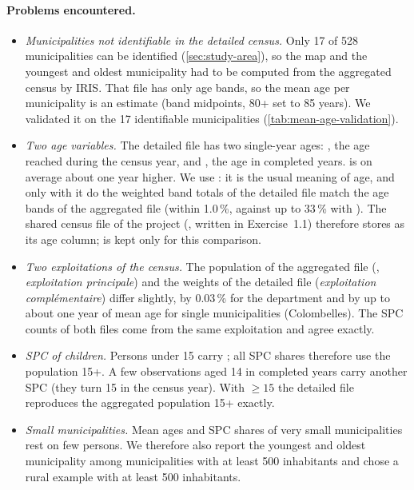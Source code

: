 \paragraph{Problems encountered.}
\begin{itemize}
  \item \emph{Municipalities not identifiable in the detailed census.} Only 17 of 528 municipalities can be identified
  (\cref{sec:study-area}), so the map and the youngest and oldest municipality had to be computed from the aggregated
  census by IRIS. That file has only age bands, so the mean age per municipality is an estimate (band midpoints, 80+
  set to 85 years). We validated it on the 17 identifiable municipalities (\cref{tab:mean-age-validation}).
  \item \emph{Two age variables.} The detailed file has two single-year ages: , the age reached during the
  census year, and , the age in completed years.  is on average about one year higher. We use
  : it is the usual meaning of age, and only with it do the weighted band totals of the detailed file match
  the age bands of the aggregated file (within 1.0\,\%, against up to 33\,\% with ). The shared census
  file of the project (, written in Exercise~1.1) therefore stores  as its
  age column;  is kept only for this comparison.
  \item \emph{Two exploitations of the census.} The population of the aggregated file (,
  \emph{exploitation principale}) and the weights of the detailed file (\emph{exploitation compl\'ementaire}) differ
  slightly, by 0.03\,\% for the department and by up to about one year of mean age for single municipalities
  (Colombelles). The SPC counts of both files come from the same exploitation and agree exactly.
  \item \emph{SPC of children.} Persons under 15 carry ; all SPC shares therefore use the population 15+.
  A few observations aged 14 in completed years carry another SPC (they turn 15 in the census year). With
   $\geq 15$ the detailed file reproduces the aggregated population 15+ exactly.
  \item \emph{Small municipalities.} Mean ages and SPC shares of very small municipalities rest on few persons. We
  therefore also report the youngest and oldest municipality among municipalities with at least 500 inhabitants and
  chose a rural example with at least 500 inhabitants.
\end{itemize}
